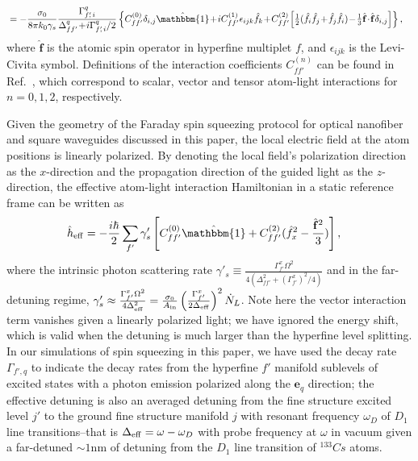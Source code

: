 \documentclass[preprint,aps,pra,onecolumn,superscriptaddress]{revtex4-1} %
\newcommand{\smallfrac}[2]{\mbox{$\frac{#1}{#2}$}}
\newcommand{\Ain}{A_{\rm in}}
\begin{document}
\begin{appendix}
\begin{align}
		&=  -\frac{\sigma_0}{8\pi k_0\gamma_s}\frac{\Gamma_{f'\!\!,\, i}^q}{\Delta_{ff'}^q\!+\! i\Gamma_{f'\!\!,\, i}^q/2}\left\{ C_{ff'}^{(0)} \delta_{i,j}\hat{\mathbbm{1}}\!+\! iC_{ff'}^{(1)}\epsilon_{ijk}\hat{f}_k \!+\! C_{ff'}^{(2)} \Big[ \smallfrac{1}{2} ( \hat{f}_i\hat{f}_j \!+\!\hat{f}_j\hat{f}_i )\!-\!\smallfrac{1}{3} \hat{\mathbf{f}}\!\cdot\!\hat{\mathbf{f}} \delta_{i,j} \Big]\right\}, 
\end{align}
where $\hat{\mathbf{f}}$ is the atomic spin operator in hyperfine multiplet $f$, and $ \epsilon_{ijk} $ is the Levi-Civita symbol. 
Definitions of the interaction coefficients $ C_{ff'}^{(n)} $ can be found in Ref.~\cite{Qi2016}, which correspond to scalar, vector and tensor atom-light interactions for $ n=0,1,2 $, respectively.

Given the geometry of the Faraday spin squeezing protocol for optical nanofiber and square waveguides discussed in this paper, the local electric field at the atom positions is linearly polarized. 
By denoting the local field's polarization direction as the $ x$-direction and the propagation direction of the guided light as the $ z $-direction, the effective atom-light interaction Hamiltonian in a static reference frame can be written as 
\begin{align}
\hat{h}_{\rm eff} &= -\frac{i\hbar}{2}\sum_{f'} \gamma'_s \left[C_{ff'}^{(0)}\hat{\mathbbm{1}}+C_{ff'}^{(2)}(\hat{f}_{x}^2-\frac{\hat{\mathbf{f}}^2}{3} ) \right],\label{eq:Heff_Faraday_C02}
\end{align}
where the intrinsic photon scattering rate $ \gamma'_s\equiv \frac{\Gamma_{f'}^x\Omega^2}{4(\Delta_{ff'}^2+\left(\Gamma_{f'}^x\right)^2/4 )}$ and in the far-detuning regime, $\gamma'_s \approx \frac{\Gamma_{f'}^x\Omega^2}{4\Delta_{\rm eff}^2}=\frac{\sigma_0}{\Ain}\left(\frac{\Gamma_{f'}^x}{2\Delta_{\rm eff}} \right)^2\dot{N}_L $. Note here the vector interaction term vanishes given a linearly polarized light; we have ignored the energy shift, which is valid when the detuning is much larger than the hyperfine level splitting.
In our simulations of spin squeezing in this paper, we have used the decay rate $ \Gamma_{f',q} $ to indicate the decay rates from the hyperfine $ f' $ manifold sublevels of excited states with a photon emission polarized along the $ \mathbf{e}_q $ direction; the effective detuning is also an averaged detuning from the fine structure excited level $ j' $ to the ground fine structure manifold $ j $ with resonant frequency $ \omega_D $ of $ D_1 $ line transitions--that is $ \Delta_{\rm eff}=\omega -\omega_D $ with probe frequency at $ \omega $ in vacuum given a far-detuned $ \sim 1 $nm of detuning from the $ D_1 $ line transition of $ ^{133}Cs $ atoms. 

\end{appendix}
\end{document}
